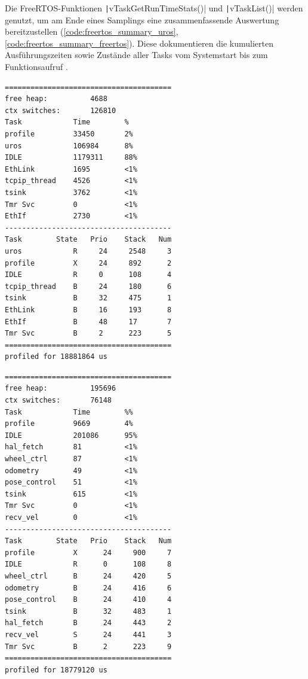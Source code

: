 Die FreeRTOS-Funktionen \texttt|vTaskGetRunTimeStats()| und
\texttt|vTaskList()| werden genutzt, um am Ende eines Samplings eine
zusammenfassende Auswertung bereitzustellen
(\ref{code:freertos_summary_uros}, \ref{code:freertos_summary_freertos}). Diese
dokumentieren die kumulierten Ausführungszeiten sowie Zustände aller Tasks vom
Systemstart bis zum Funktionsaufruf \cite{freertos_runtime_stats}.

\begin{minipage}[t]{0.5\textwidth}
\begin{code}
    \begin{verbatim}
=======================================
free heap:          4688
ctx switches:       126810
Task            Time        %
profile         33450       2%
uros            106984      8%
IDLE            1179311     88%
EthLink         1695        <1%
tcpip_thread    4526        <1%
tsink           3762        <1%
Tmr Svc         0           <1%
EthIf           2730        <1%
---------------------------------------
Task        State   Prio    Stack   Num
uros            R     24     2548     3
profile         X     24     892      2
IDLE            R     0      108      4
tcpip_thread    B     24     180      6
tsink           B     32     475      1
EthLink         B     16     193      8
EthIf           B     48     17       7
Tmr Svc         B     2      223      5
=======================================
profiled for 18881864 us
\end{verbatim}
    \label{code:freertos_summary_uros}
\end{code}
\end{minipage}
\hfill
\begin{minipage}[t]{0.5\textwidth}
\begin{code}
\begin{verbatim}
=======================================
free heap:          195696
ctx switches:       76148
Task            Time        %%
profile         9669        4%
IDLE            201086      95%
hal_fetch       81          <1%
wheel_ctrl      87          <1%
odometry        49          <1%
pose_control    51          <1%
tsink           615         <1%
Tmr Svc         0           <1%
recv_vel        0           <1%
---------------------------------------
Task        State   Prio    Stack   Num
profile         X      24     900     7
IDLE            R      0      108     8
wheel_ctrl      B      24     420     5
odometry        B      24     416     6
pose_control    B      24     410     4
tsink           B      32     483     1
hal_fetch       B      24     443     2
recv_vel        S      24     441     3
Tmr Svc         B      2      223     9
=======================================
profiled for 18779120 us
\end{verbatim}
    \label{code:freertos_summary_freertos}
\end{code}
\end{minipage}


